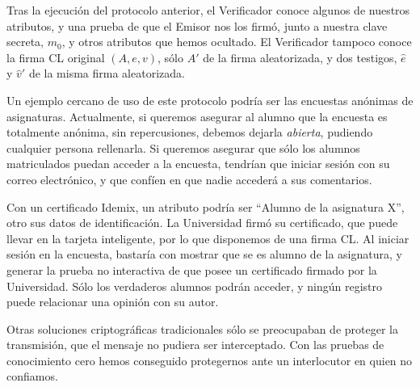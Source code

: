Tras la ejecución del protocolo anterior, el Verificador conoce algunos de nuestros atributos, y una prueba de que el Emisor nos los firmó, junto a nuestra clave secreta, $m_0$, y otros atributos que hemos ocultado. El Verificador tampoco conoce la firma CL original $(A,e,v)$, sólo $A'$ de la firma aleatorizada, y dos testigos, $\hat{e}$ y $\hat{v}'$ de la misma firma aleatorizada.

Un ejemplo cercano de uso de este protocolo podría ser las encuestas anónimas de asignaturas. Actualmente, si queremos asegurar al alumno que la encuesta es totalmente anónima, sin repercusiones, debemos dejarla \textit{abierta}, pudiendo cualquier persona rellenarla. Si queremos asegurar que sólo los alumnos matriculados puedan acceder a la encuesta, tendrían que iniciar sesión con su correo electrónico, y que confíen en que nadie accederá a sus comentarios.

Con un certificado Idemix, un atributo podría ser ``Alumno de la asignatura X'', otro sus datos de identificación. La Universidad firmó su certificado, que puede llevar en la tarjeta inteligente, por lo que disponemos de una firma CL. Al iniciar sesión en la encuesta, bastaría con mostrar que se es alumno de la asignatura, y generar la prueba no interactiva de que posee un certificado firmado por la Universidad. Sólo los verdaderos alumnos podrán acceder, y ningún registro puede relacionar una opinión con su autor.

Otras soluciones criptográficas tradicionales sólo se preocupaban de proteger la transmisión, que el mensaje no pudiera ser interceptado. Con las pruebas de conocimiento cero hemos conseguido protegernos ante un interlocutor en quien no confiamos.









